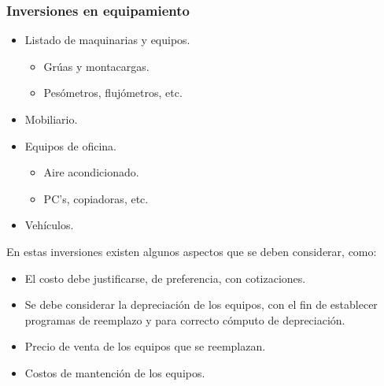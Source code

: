 \documentclass{templateNote}
\begin{document}
\subsubsection*{Inversiones en equipamiento}
\vspace{0.5cm}
\begin{minipage}[H]{0.45\textwidth}
    \begin{itemize}
        \item Listado de maquinarias y equipos.
        \begin{itemize}
            \item Grúas y montacargas.
            \item Pesómetros, flujómetros, etc.
        \end{itemize}
        \item Mobiliario.
    \end{itemize}
\end{minipage}
\hfill
\begin{minipage}[H]{0.45\textwidth}
    \begin{itemize}
        \item Equipos de oficina.
        \begin{itemize}
            \item Aire acondicionado.
            \item PC's, copiadoras, etc.
        \end{itemize}
        \item Vehículos.
    \end{itemize}
\end{minipage}

En estas inversiones existen algunos aspectos que se deben considerar, como:
\begin{itemize}
    \item El costo debe justificarse, de preferencia, con cotizaciones.
    \item Se debe considerar la depreciación de los equipos, con el fin de establecer programas de reemplazo y para correcto cómputo de depreciación.
    \item Precio de venta de los equipos que se reemplazan.
    \item Costos de mantención de los equipos. 
\end{itemize}
\end{document}
